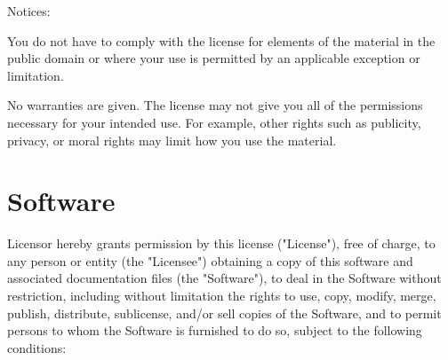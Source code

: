 \documentclass[krantzl]{krantz}
\begin{document}
Notices:


You do not have to comply with the license for elements of the material in the
public domain or where your use is permitted by an applicable exception or
limitation.


No warranties are given. The license may not give you all of the permissions
necessary for your intended use. For example, other rights such as publicity,
privacy, or moral rights may limit how you use the material.

\section*{Software}


Licensor hereby grants permission by this license ("License"), free of charge,
to any person or entity (the "Licensee") obtaining a copy of this software and
associated documentation files (the "Software"), to deal in the Software without
restriction, including without limitation the rights to use, copy, modify,
merge, publish, distribute, sublicense, and/or sell copies of the Software, and
to permit persons to whom the Software is furnished to do so, subject to the
following conditions:
\end{document}
